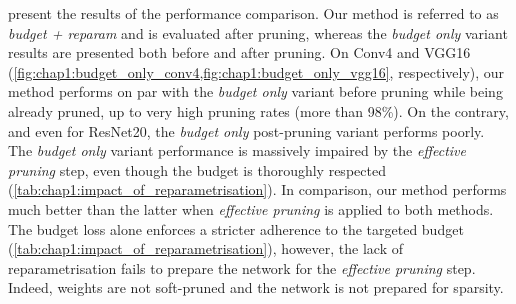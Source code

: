 present the results of the performance comparison. Our method is referred to as
\emph{budget + reparam} and is evaluated after pruning, whereas the \emph{budget
only} variant results are presented both before and after pruning. On Conv4 and
VGG16 (\cref{fig:chap1:budget_only_conv4,fig:chap1:budget_only_vgg16},
respectively), our method performs on par with the \emph{budget only} variant
before pruning while being already pruned, up to very high pruning rates (more
than 98\%). On the contrary, and even for ResNet20, the \emph{budget only}
post-pruning variant performs poorly. The \emph{budget only} variant performance
is massively impaired by the \emph{effective pruning} step, even though the
budget is thoroughly respected (\cref{tab:chap1:impact_of_reparametrisation}).
In comparison, our method performs much better than the latter when
\textit{effective pruning} is applied to both methods. The budget loss alone
enforces a stricter adherence to the targeted budget
(\cref{tab:chap1:impact_of_reparametrisation}), however, the lack of
reparametrisation fails to prepare the network for the \emph{effective pruning}
step. Indeed, weights are not soft-pruned and the network is not prepared for
sparsity.\\

